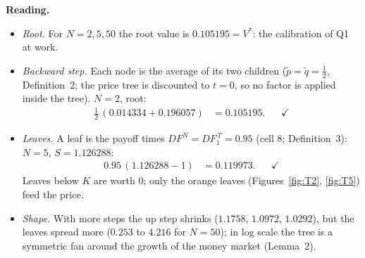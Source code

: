 \documentclass[11pt,a4paper]{article}
\begin{document}
\begin{center}
\label{fig:T50}
\end{center}

\par\medskip\noindent\textbf{Reading.}
\begin{itemize}
\item \emph{Root.} For $N=2,5,50$ the root value is $0.105195=V^*$: the calibration of Q1 at work.
\item \emph{Backward step.} Each node is the average of its two children ($\tilde p=\tilde q=\frac12$, Definition~2; the price tree is discounted to $t=0$, so no factor is applied inside the tree). $N=2$, root:
\begin{align*}
\tfrac12\,(0.014334+0.196057) &= 0.105195 . && \checkmark
\end{align*}
\item \emph{Leaves.} A leaf is the payoff times $DF^N=DF_1^{\,T}=0.95$ (cell 8; Definition~3): $N=5$, $S=1.126288$:
\begin{align*}
0.95\,(1.126288-1) &= 0.119973 . && \checkmark
\end{align*}
Leaves below $K$ are worth $0$; only the orange leaves (Figures~\ref{fig:T2}, \ref{fig:T5}) feed the price.
\item \emph{Shape.} With more steps the up step shrinks ($1.1758$, $1.0972$, $1.0292$), but the leaves spread more ($0.253$ to $4.216$ for $N=50$); in log scale the tree is a symmetric fan around the growth of the money market (Lemma~2).
\end{itemize}
\end{document}
